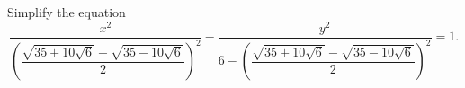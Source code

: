 Simplify the equation
\[
\dfrac{x^{2}}{\left(\dfrac{\sqrt{35+10\sqrt6}-\sqrt{35-10\sqrt6}}{2}\right)^{2}}-\dfrac{y^{2}}{6-\left(\dfrac{\sqrt{35+10\sqrt6}-\sqrt{35-10\sqrt6}}{2}\right)^{2}}=1 .
\]

